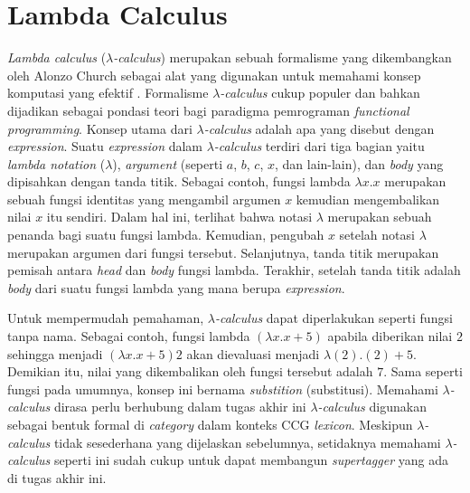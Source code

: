 \section{Lambda Calculus}
\textit{Lambda calculus} ({$\lambda$}\textit{-calculus}) merupakan sebuah formalisme yang dikembangkan
oleh Alonzo Church sebagai alat yang digunakan untuk memahami konsep komputasi yang efektif
\cite{DBLP:journals/corr/Rojas15}.
Formalisme {$\lambda$}\textit{-calculus} cukup populer dan bahkan dijadikan sebagai pondasi teori bagi
paradigma pemrograman \textit{functional programming}.
Konsep utama dari {$\lambda$}\textit{-calculus} adalah apa yang disebut dengan \textit{expression}.
Suatu \textit{expression} dalam {$\lambda$}\textit{-calculus} terdiri dari tiga bagian yaitu
\textit{lambda notation} ({$\lambda$}), \textit{argument} (seperti $a$, $b$, $c$, $x$, dan lain-lain),
dan \textit{body} yang dipisahkan dengan tanda titik.
Sebagai contoh, fungsi lambda ${\lambda}x. x$ merupakan sebuah fungsi identitas yang mengambil
argumen $x$ kemudian mengembalikan nilai $x$ itu sendiri.
Dalam hal ini, terlihat bahwa notasi {$\lambda$} merupakan sebuah penanda bagi suatu fungsi lambda.
Kemudian, pengubah $x$ setelah notasi {$\lambda$} merupakan argumen dari fungsi tersebut.
Selanjutnya, tanda titik merupakan pemisah antara \textit{head} dan \textit{body} fungsi lambda.
Terakhir, setelah tanda titik adalah \textit{body} dari suatu fungsi lambda yang mana berupa
\textit{expression}.

Untuk mempermudah pemahaman, {$\lambda$}\textit{-calculus} dapat diperlakukan seperti fungsi tanpa
nama. Sebagai contoh, fungsi lambda $({\lambda}x. x + 5)$ apabila diberikan nilai $2$ sehingga
menjadi $({\lambda}x. x + 5) 2$ akan dievaluasi menjadi ${\lambda}(2). (2) + 5$.
Demikian itu, nilai yang dikembalikan oleh fungsi tersebut adalah $7$.
Sama seperti fungsi pada umumnya, konsep ini bernama \textit{substition} (substitusi).
Memahami {$\lambda$}\textit{-calculus} dirasa perlu berhubung dalam tugas akhir ini
{$\lambda$}\textit{-calculus} digunakan sebagai bentuk formal di \textit{category}
dalam konteks CCG \textit{lexicon}. Meskipun {$\lambda$}\textit{-calculus} tidak sesederhana
yang dijelaskan sebelumnya, setidaknya memahami {$\lambda$}\textit{-calculus} seperti ini
sudah cukup untuk dapat membangun \textit{supertagger} yang ada di tugas akhir ini.


